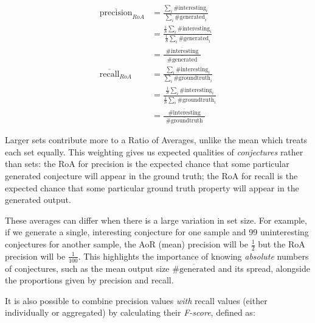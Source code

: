 \begin{align*}
       \overline{\text{precision}}_{RoA}
    &= \frac{\sum_i{\#\text{interesting}_i}}
            {\sum_i{\#\text{generated}_i}}                              \\
    &= \frac{\frac{1}{S} \sum_i{\#\text{interesting}_i}}
            {\frac{1}{S} \sum_i{\#\text{generated}_i}}                  \\
    &= \frac{\hspace{5pt} \overline{\#\text{interesting}} \hspace{5pt}}
            {\hspace{5pt} \overline{\#\text{generated}}   \hspace{5pt}} \\[10pt]
       \overline{\text{recall}}_{RoA}
    &= \frac{\sum_i{\#\text{interesting}_i}}
            {\sum_i{\#\text{groundtruth}_i}}                            \\
    &= \frac{\frac{1}{S} \sum_i{\#\text{interesting}_i}}
            {\frac{1}{S} \sum_i{\#\text{groundtruth}_i}}                \\
    &= \frac{\hspace{5pt} \overline{\#\text{interesting}} \hspace{5pt}}
            {\hspace{5pt} \overline{\#\text{groundtruth}} \hspace{5pt}}
\end{align*}

Larger sets contribute more to a Ratio of Averages, unlike the mean which treats
each set equally. This weighting gives us expected qualities of
\emph{conjectures} rather than sets: the RoA for precision is the expected
chance that some particular generated conjecture will appear in the ground
truth; the RoA for recall is the expected chance that some particular ground
truth property will appear in the generated output.

These averages can differ when there is a large variation in set size. For
example, if we generate a single, interesting conjecture for one sample and 99
uninteresting conjectures for another sample, the AoR (mean) precision will be
$\frac{1}{2}$ but the RoA precision will be $\frac{1}{100}$. This highlights the
importance of knowing \emph{absolute} numbers of conjectures, such as the mean
output size $\overline{\#\text{generated}}$ and its spread, alongside the
proportions given by precision and recall.

It is also possible to combine precision values \emph{with} recall values
(either individually or aggregated) by calculating their \emph{F-score}, defined
as:

